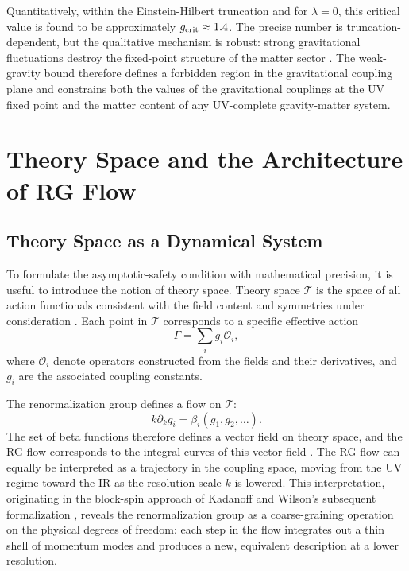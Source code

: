 \documentclass[12pt,a4paper]{article}
\begin{document}
Quantitatively, within the Einstein-Hilbert truncation and for $\lambda = 0$,
this critical value is found to be approximately $g_{\rm crit} \approx 1.4$.
The precise number is truncation-dependent, but the qualitative mechanism is
robust: strong gravitational fluctuations destroy the fixed-point structure of
the matter sector \cite{EichhornSchiffer2022handbook,Eichhorn2019}. The
weak-gravity bound therefore defines a forbidden region in the gravitational
coupling plane and constrains both the values of the gravitational couplings at
the UV fixed point and the matter content of any UV-complete gravity-matter
system.

\section{Theory Space and the Architecture of RG Flow}

\subsection{Theory Space as a Dynamical System}

To formulate the asymptotic-safety condition with mathematical precision, it
is useful to introduce the notion of theory space. Theory space $\mathcal{T}$
is the space of all action functionals consistent with the field content and
symmetries under consideration \cite{WilsonKogut1974,Polchinski1984}. Each
point in $\mathcal{T}$ corresponds to a specific effective action
\begin{equation}
\Gamma = \sum_i g_i \mathcal{O}_i,
\end{equation}
where $\mathcal{O}_i$ denote operators constructed from the fields and their
derivatives, and $g_i$ are the associated coupling constants.

The renormalization group defines a flow on $\mathcal{T}$:
\begin{equation}
k\partial_k g_i = \beta_i(g_1,g_2,\ldots).
\end{equation}
The set of beta functions therefore defines a vector field on theory space,
and the RG flow corresponds to the integral curves of this vector field
\cite{Wilson1971,Cardy1996,Goldenfeld1992}. The RG flow can equally be
interpreted as a trajectory in the coupling space, moving from the UV regime
toward the IR as the resolution scale $k$ is lowered. This interpretation,
originating in the block-spin approach of Kadanoff \cite{Kadanoff1966} and
Wilson's subsequent formalization \cite{Wilson1971,WilsonKogut1974}, reveals
the renormalization group as a coarse-graining operation on the physical
degrees of freedom: each step in the flow integrates out a thin shell of
momentum modes and produces a new, equivalent description at a lower
resolution.
\end{document}
